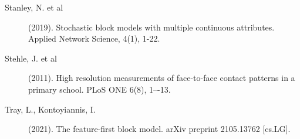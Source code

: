 \begin{description}
	\item[Stanley, N. et al] (2019). Stochastic block models with multiple continuous attributes. Applied Network Science, 4(1), 1-22.

	\item[Stehle, J. et al] (2011).
	High resolution measurements of face-to-face contact patterns in a primary school.
	PLoS ONE 6(8), 1–-13.

	\item[Tray, L., Kontoyiannis, I.] (2021).
	The feature-first block model.
	arXiv preprint 2105.13762 [cs.LG].

\end{description}

